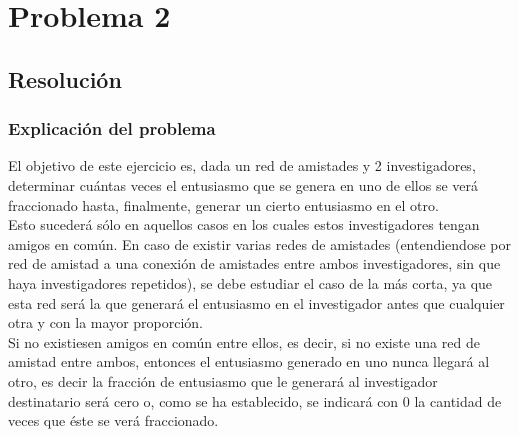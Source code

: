\section{Problema 2}

\subsection{Resolución}

\subsubsection{Explicación del problema}
\indent El objetivo de este ejercicio es, dada un red de amistades y 2
investigadores, determinar cuántas veces el entusiasmo que se genera en uno de
ellos se verá fraccionado hasta, finalmente, generar un cierto entusiasmo en el
otro. \\
\indent Esto sucederá sólo en aquellos casos en los cuales estos investigadores
tengan amigos en común. En caso de existir varias redes de amistades
(entendiendose por red de amistad a una conexión de amistades entre ambos
investigadores, sin que haya investigadores repetidos), se debe estudiar el caso
de la más corta, ya que esta red será la que generará el entusiasmo en el
investigador antes que cualquier otra y con la mayor proporción. \\
\indent Si no existiesen amigos en común entre ellos, es decir, si no existe una
red de amistad entre ambos, entonces el entusiasmo generado en uno nunca llegará
al otro, es decir la fracción de entusiasmo que le generará al investigador
destinatario será cero o, como se ha establecido, se indicará con $0$ la
cantidad de veces que éste se verá fraccionado. \\

